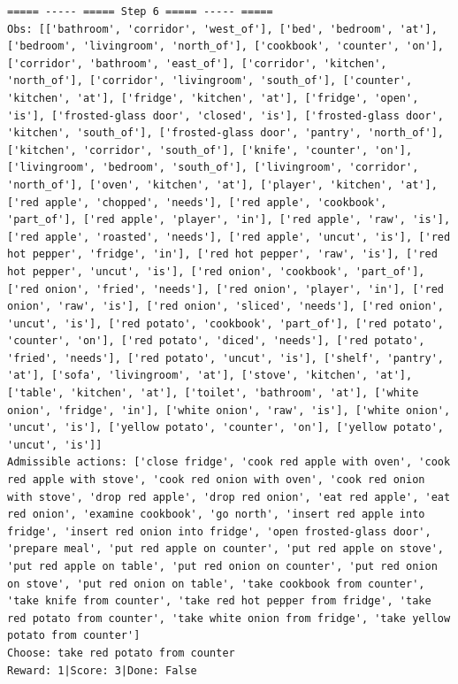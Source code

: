 \documentclass[11pt]{article}
\begin{document}
\begin{lstlisting}
===== ----- ===== Step 6 ===== ----- =====
Obs: [['bathroom', 'corridor', 'west_of'], ['bed', 'bedroom', 'at'], ['bedroom', 'livingroom', 'north_of'], ['cookbook', 'counter', 'on'], ['corridor', 'bathroom', 'east_of'], ['corridor', 'kitchen', 'north_of'], ['corridor', 'livingroom', 'south_of'], ['counter', 'kitchen', 'at'], ['fridge', 'kitchen', 'at'], ['fridge', 'open', 'is'], ['frosted-glass door', 'closed', 'is'], ['frosted-glass door', 'kitchen', 'south_of'], ['frosted-glass door', 'pantry', 'north_of'], ['kitchen', 'corridor', 'south_of'], ['knife', 'counter', 'on'], ['livingroom', 'bedroom', 'south_of'], ['livingroom', 'corridor', 'north_of'], ['oven', 'kitchen', 'at'], ['player', 'kitchen', 'at'], ['red apple', 'chopped', 'needs'], ['red apple', 'cookbook', 'part_of'], ['red apple', 'player', 'in'], ['red apple', 'raw', 'is'], ['red apple', 'roasted', 'needs'], ['red apple', 'uncut', 'is'], ['red hot pepper', 'fridge', 'in'], ['red hot pepper', 'raw', 'is'], ['red hot pepper', 'uncut', 'is'], ['red onion', 'cookbook', 'part_of'], ['red onion', 'fried', 'needs'], ['red onion', 'player', 'in'], ['red onion', 'raw', 'is'], ['red onion', 'sliced', 'needs'], ['red onion', 'uncut', 'is'], ['red potato', 'cookbook', 'part_of'], ['red potato', 'counter', 'on'], ['red potato', 'diced', 'needs'], ['red potato', 'fried', 'needs'], ['red potato', 'uncut', 'is'], ['shelf', 'pantry', 'at'], ['sofa', 'livingroom', 'at'], ['stove', 'kitchen', 'at'], ['table', 'kitchen', 'at'], ['toilet', 'bathroom', 'at'], ['white onion', 'fridge', 'in'], ['white onion', 'raw', 'is'], ['white onion', 'uncut', 'is'], ['yellow potato', 'counter', 'on'], ['yellow potato', 'uncut', 'is']]
Admissible actions: ['close fridge', 'cook red apple with oven', 'cook red apple with stove', 'cook red onion with oven', 'cook red onion with stove', 'drop red apple', 'drop red onion', 'eat red apple', 'eat red onion', 'examine cookbook', 'go north', 'insert red apple into fridge', 'insert red onion into fridge', 'open frosted-glass door', 'prepare meal', 'put red apple on counter', 'put red apple on stove', 'put red apple on table', 'put red onion on counter', 'put red onion on stove', 'put red onion on table', 'take cookbook from counter', 'take knife from counter', 'take red hot pepper from fridge', 'take red potato from counter', 'take white onion from fridge', 'take yellow potato from counter']
Choose: take red potato from counter
Reward: 1|Score: 3|Done: False


\end{lstlisting}
\end{document}
